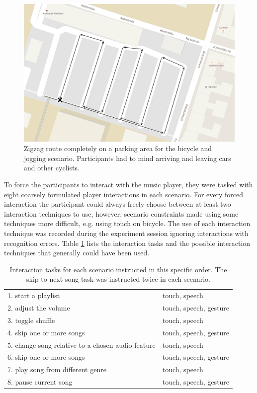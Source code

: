 \begin{figure}[bth]
	\myfloatalign
	\includegraphics[width=.8\linewidth]{img/parkplatzRoute.png}
	\caption{Zigzag route completely on a parking area for the bicycle and jogging scenario. Participants had to mind arriving and leaving cars and other cyclists.}
	\label{fig:parkingRoute}
\end{figure}

To force the participants to interact with the music player, they were tasked with eight coarsely formulated player interactions in each scenario. For every forced interaction the participant could always freely choose between at least two interaction techniques to use, however, scenario constraints made using some techniques more difficult, e.g. using touch on bicycle. The use of each interaction technique was recorded during the experiment session ignoring interactions with recognition errors. Table \ref{tab:scenarioTasks} lists the interaction tasks and the possible interaction techniques that generally could have been used.

\begin{table}[h]
	\myfloatalign
	\begin{tabularx}{\textwidth}{XX} \toprule
		\tableheadline{Forced Interaction} & \tableheadline{Possible techniques} \\ 
		\midrule
		1. start a playlist & touch, speech \\
		2. adjust the volume & touch, speech, gesture \\
		3. toggle shuffle & touch, speech \\
		4. skip one or more songs & touch, speech, gesture \\
		5. change song relative to a chosen audio feature & touch, speech \\
		6. skip one or more songs & touch, speech, gesture \\
		7. play song from different genre & touch, speech \\
		8. pause current song & touch, speech, gesture \\
		\bottomrule
	\end{tabularx}
	\caption{Interaction tasks for each scenario instructed in this specific order. The skip to next song task was instructed twice in each scenario.}
	\label{tab:scenarioTasks}
\end{table}

